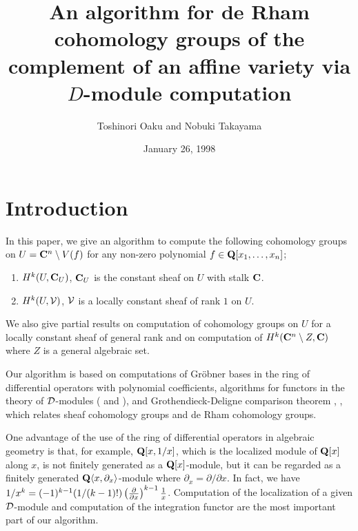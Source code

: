 \documentclass[12pt]{article}
\title{{\bf An algorithm for de Rham cohomology groups
            of the complement of an affine variety 
            via $D$-module computation}}
\author{Toshinori Oaku and Nobuki Takayama}
\date{January 26, 1998}
\def\pd#1{ \partial_{#1} }
\def\C{{\bf C}}
\def\Q{{\bf Q}}
\def\Dsc{ {\cal D} }
\def\Vsc{ {\cal V} }
\def\comment#1{  }
\begin{document}
\maketitle

\comment{ Abstract :
We give an algorithm to compute the following cohomology groups
on $U = \C^n \setminus V(f)$ for any non-zero polynomial
$f \in \Q[x_1, \ldots, x_n]$;
1. $H^k(U, \C_U)$, $\C_U$ is the constant sheaf on $U$ with stalk $\C$.
2. $H^k(U, \Vsc)$, $\Vsc$ is a locally constant sheaf of rank $1$ on $U$.
We also give partial results on computation of cohomology groups on $U$
for a locally constant sheaf of general rank and on computation of
$H^k(\C^n \setminus Z, \C)$ where $Z$ is a general algebraic set.
Our algorithm is based on computations of Gr\"obner bases in the ring
of differential operators with polynomial coefficients.
14F40, 14Q99, 55N30.
}

\setcounter{section}{-1}
\section{Introduction}

In this paper, 
we give an algorithm to compute the following cohomology groups
on $U = \C^n \setminus V(f)$
for any non-zero polynomial
$f \in \Q[x_1, \ldots, x_n]$;
\begin{enumerate}
\item $H^k(U, \C_U)$, $\C_U$ is the constant sheaf on $U$ with stalk $\C$.
\item $H^k(U, \Vsc)$, $\Vsc$ is a locally constant sheaf of rank $1$ on $U$.
\end{enumerate}
We also give partial results on computation of cohomology groups on $U$
for a locally constant sheaf of general rank and on computation of
$H^k(\C^n \setminus Z, \C)$ where $Z$ is a general algebraic set.

Our algorithm is based on computations of Gr\"obner bases in the ring
of differential operators with polynomial coefficients,
algorithms for functors in the theory of $\Dsc$-modules 
(\cite{OakuAdvance} and \cite{OakuAdvance2}),
and Grothendieck-Deligne comparison theorem \cite{G}, \cite{D},
which relates sheaf cohomology groups and de Rham cohomology groups.


One advantage of the use of the ring of differential operators
in algebraic geometry is that, for example, 
$\Q[x,1/x]$, which is the localized module of $\Q[x]$ along $x$,
is not finitely generated as a $\Q[x]$-module, but it can be regarded
as a finitely generated $\Q \langle x, \pd{x} \rangle$-module 
where $\pd{x} = \partial/\partial x$.
In fact, we have
$ 1/x^k = (-1)^{k-1}(1/(k-1)!) 
  \left( {\partial \over {\partial x}} \right)^{k-1} {1 \over x}$.
Computation of the localization of a given $\Dsc$-module and computation
of the integration functor are the most important part of our algorithm.
\end{document}
